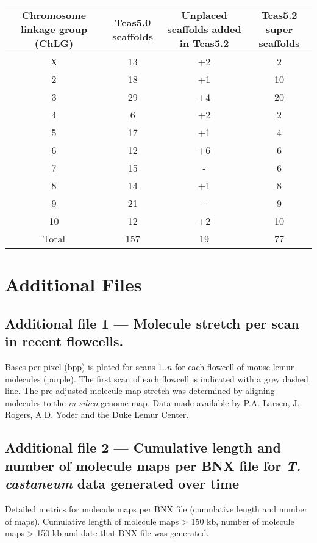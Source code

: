 \documentclass{bmcart}
\begin{document}
\begin{backmatter}
\begin{table}[h!]
\begin{tabular}{cccc}
		\hline
		Chromosome linkage group (ChLG) & Tcas5.0 scaffolds & Unplaced scaffolds added in Tcas5.2 & Tcas5.2 super scaffolds \\ \hline
		X & 13 & +2 & 2\\
		2 & 18 & +1 & 10\\
		3 & 29 & +4 & 20\\
		4 & 6 & +2 & 2\\
		5 & 17 & +1 & 4\\
		6 & 12 & +6 & 6\\
		7 & 15 & - & 6\\
		8 & 14 & +1 & 8\\
		9 & 21 & - & 9\\
		10 & 12 & +2 & 10\\ \hline
		Total & 157 & 19 & 77\\ \hline
	\end{tabular}
\end{table}




\section*{Additional Files}

\subsection*{Additional file 1 --- Molecule stretch per scan in recent flowcells.} Bases per pixel (bpp) is ploted for scans 1..$n$ for each flowcell of mouse lemur molecules (purple). The first scan of each flowcell is indicated with a grey dashed line. The pre-adjusted molecule map stretch was determined by aligning molecules to the \textit{in silico} genome map. Data made available by P.A. Larsen, J. Rogers, A.D. Yoder and the Duke Lemur Center.

\subsection*{Additional file 2 --- Cumulative length and number of molecule maps per BNX file for \textit{T. castaneum} data generated over time}
    Detailed metrics for molecule maps per BNX file (cumulative length and number of maps). Cumulative length of molecule maps  > 150 kb, number of molecule maps > 150 kb and date that BNX file was generated.


\end{backmatter}
\end{document}
